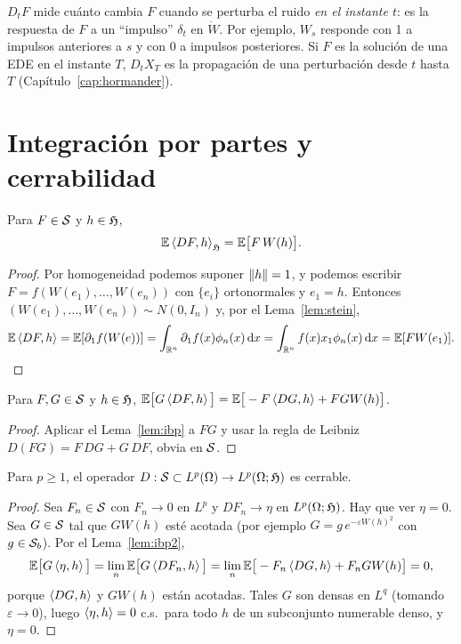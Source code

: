 \begin{intuicion}
$D_tF$ mide cuánto cambia $F$ cuando se perturba el ruido \emph{en el instante $t$}: es la respuesta
de $F$ a un ``impulso'' $\delta_t$ en $\dot W$. Por ejemplo, $W_s$ responde con 1 a impulsos anteriores a $s$
y con 0 a impulsos posteriores. Si $F$ es la solución de una EDE en el instante $T$, $D_tX_T$
es la propagación de una perturbación desde $t$ hasta $T$ (Capítulo~\ref{cap:hormander}).
\end{intuicion}

\section{Integración por partes y cerrabilidad}

\begin{lema}\label{lem:ibp}
Para $F\in\mathcal{S}$ y $h\in\mathfrak{H}$,
\[
  \mathbb{E}\left\langle DF, h\right\rangle_{\mathfrak{H}}=\mathbb{E}\big[F\,W(h)\big].
\]
\end{lema}

\begin{proof}
Por homogeneidad podemos suponer $\left\lVert h\right\rVert=1$, y podemos escribir $F=
f(W(e_1),\dots,W(e_n))$ con $\{e_i\}$ ortonormales y $e_1=h$. Entonces $(W(e_1),\dots,W(e_n))\sim N(0,I_n)$
y, por el Lema~\ref{lem:stein},
\[
  \mathbb{E}\left\langle DF, h\right\rangle=\mathbb{E}[\partial_1f(W(e))]=\int_{\mathbb{R}^n}\partial_1f(x)\phi_n(x)\,\mathrm{d} x=\int_{\mathbb{R}^n}f(x)x_1\phi_n(x)\,\mathrm{d} x=\mathbb{E}[FW(e_1)].
  \qedhere
\]
\end{proof}

\begin{lema}\label{lem:ibp2}
Para $F,G\in\mathcal{S}$ y $h\in\mathfrak{H}$, $\mathbb{E}\big[G\left\langle DF, h\right\rangle\big]=\mathbb{E}\big[-F\left\langle DG, h\right\rangle+FGW(h)\big]$.
\end{lema}

\begin{proof}
Aplicar el Lema~\ref{lem:ibp} a $FG$ y usar la regla de Leibniz $D(FG)=F\,DG+G\,DF$,
obvia en $\mathcal{S}$.
\end{proof}

\begin{proposicion}[Cerrabilidad]\label{prop:cerrabilidad}
Para $p\ge1$, el operador $D:\mathcal{S}\subset L^p(\Omega)\to L^p(\Omega;\mathfrak{H})$ es
cerrable.
\end{proposicion}

\begin{proof}
Sea $F_n\in\mathcal{S}$ con $F_n\to0$ en $L^p$ y $DF_n\to\eta$ en $L^p(\Omega;\mathfrak{H})$. Hay que ver $\eta=0$. Sea
$G\in\mathcal{S}$ tal que $GW(h)$ esté acotada (por ejemplo $G=g\,e^{-\varepsilon W(h)^2}$ con $g\in\mathcal{S}_b$). Por el Lema~\ref{lem:ibp2},
\[
  \mathbb{E}\big[G\left\langle \eta, h\right\rangle\big]=\lim_n\mathbb{E}\big[G\left\langle DF_n, h\right\rangle\big]=\lim_n\mathbb{E}\big[-F_n\left\langle DG, h\right\rangle+F_nGW(h)\big]=0,
\]
porque $\left\langle DG, h\right\rangle$ y $GW(h)$ están acotadas. Tales $G$ son densas en $L^q$ (tomando $\varepsilon\to0$), luego
$\left\langle \eta, h\right\rangle=0$ c.s.\ para todo $h$ de un subconjunto numerable denso, y $\eta=0$.
\end{proof}

